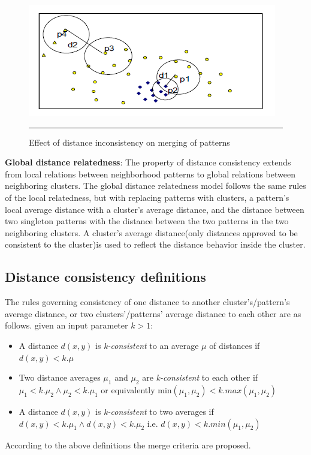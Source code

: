 \begin{figure}[htbp]
	\centering
		\includegraphics{./Figures/Mitosis_2.png}
		\rule{35em}{0.5pt}
	\caption[Effect of distance inconsistency on merging of patterns]{Effect of distance inconsistency on merging of patterns}
	\label{fig:mitosis_2}
\end{figure}


\textbf{Global distance relatedness}: The property of distance consistency
extends from local relations between neighborhood patterns to global relations between neighboring clusters. The global distance relatedness model follows the same rules of the local relatedness, but with replacing patterns with clusters, a pattern's local average distance with a cluster's average distance, and the distance between two singleton patterns with the distance between the two patterns in the two neighboring clusters. A cluster's average distance(only distances approved to be consistent to the cluster)is used to reflect the distance behavior inside the cluster.

\subsection{Distance consistency definitions}
The rules governing consistency of one distance to another cluster's/pattern's average distance, or two clusters'/patterns' average
distance to each other are as follows. given an input parameter $k > 1$:
\begin{itemize}
\item A distance $d(x,y)$ is \textit{k-consistent} to an average $\mu$ of distances if
$d(x, y)<k. \mu$
\item Two distance averages $\mu_1$ and $\mu_2$ are \textit{k-consistent} to each other if $\mu_1 < k.\mu_2 \wedge \mu_2 <k.\mu_1$ or equivalently min$(\mu_1, \mu_2)< k.max(\mu_1, \mu_2)$
\item A distance $d(x,y)$ is \textit{k-consistent} to two averages if $d(x, y)< k.\mu_1 \wedge d(x, y)< k.\mu_2$  i.e. $d(x, y)< k.min(\mu_1, \mu_2)$
\end{itemize}
According to the above definitions the merge criteria are proposed.

